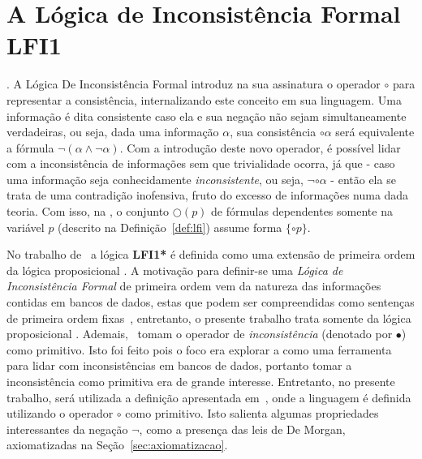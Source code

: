 \chapter{A Lógica de Inconsistência Formal LFI1}
\label{cap:LFI1}

 . A Lógica De Inconsistência Formal \lfium{} introduz na sua assinatura o operador $\circ$ para representar a consistência, internalizando este conceito em sua linguagem. Uma informação é dita consistente caso ela e sua negação não sejam simultaneamente verdadeiras, ou seja, dada uma informação $\alpha$, sua consistência $\circ \alpha$ será equivalente a fórmula $\neg (\alpha \land \neg \alpha)$. Com a introdução deste novo operador, é possível lidar com a inconsistência de informações sem que trivialidade ocorra, já que {-} caso uma informação seja conhecidamente \textit{inconsistente}, ou seja, $\neg \circ \alpha$ {-} então ela se trata de uma contradição inofensiva, fruto do excesso de informações numa dada teoria. Com isso, na \lfium{}, o conjunto $\bigcirc(p)$ de fórmulas dependentes somente na variável $p$ (descrito na Definição~\ref{def:lfi}) assume forma $\{\circ p\}$.

No trabalho de~ a lógica \textbf{LFI1*} é definida como uma extensão de primeira ordem da lógica proposicional \lfium{}. A motivação para definir-se uma \textit{Lógica de Inconsistência Formal} de primeira ordem vem da natureza das informações contidas em bancos de dados, estas que podem ser compreendidas como sentenças de primeira ordem fixas~\cite{Codd}, entretanto, o presente trabalho trata somente da lógica proposicional \lfium{}. Ademais,~ tomam o operador de \textit{inconsistência} (denotado por $\bullet$) como primitivo. Isto foi feito pois o foco era explorar a \lfium{} como uma ferramenta para lidar com inconsistências em bancos de dados, portanto tomar a inconsistência como primitiva era de grande interesse. Entretanto, no presente trabalho, será utilizada a definição apresentada em~, onde a linguagem é definida utilizando o operador $\circ$ como primitivo. Isto salienta algumas propriedades interessantes da negação $\neg$, como a presença das leis de De Morgan, axiomatizadas na Seção~\ref{sec:axiomatizacao}.

